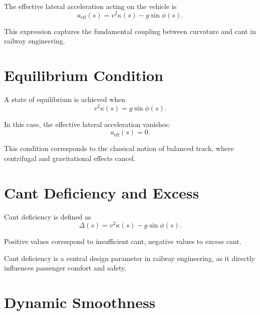 \begin{definition}
The effective lateral acceleration acting on the vehicle is
\[
a_{\mathrm{eff}}(s)
=
v^2 \kappa(s) - g \sin\phi(s).
\]
\end{definition}

\begin{remark}
This expression captures the fundamental coupling between curvature and
cant in railway engineering.
\end{remark}

\section{Equilibrium Condition}

\begin{definition}
A state of equilibrium is achieved when
\[
v^2 \kappa(s) = g \sin\phi(s).
\]
\end{definition}

\begin{remark}
In this case, the effective lateral acceleration vanishes:
\[
a_{\mathrm{eff}}(s) = 0.
\]
\end{remark}

\begin{remark}
This condition corresponds to the classical notion of balanced track,
where centrifugal and gravitational effects cancel.
\end{remark}

\section{Cant Deficiency and Excess}

\begin{definition}
Cant deficiency is defined as
\[
\Delta(s)
=
v^2 \kappa(s) - g \sin\phi(s).
\]
\end{definition}

\begin{remark}
Positive values correspond to insufficient cant, negative values to
excess cant.
\end{remark}

\begin{remark}
Cant deficiency is a central design parameter in railway engineering,
as it directly influences passenger comfort and safety.
\end{remark}

\section{Dynamic Smoothness}

